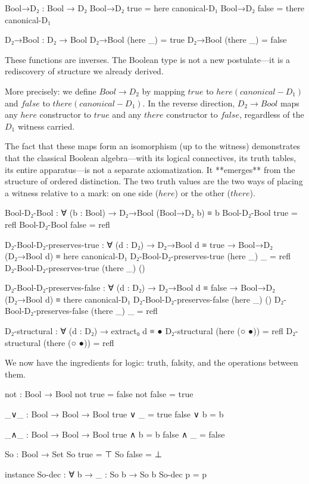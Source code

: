 \documentclass[11pt,a4paper]{book}
\def\texttt#1{#1}%
\def\text#1{#1}%
\begin{document}
\begin{code}
Bool→D₂ : Bool → D₂
Bool→D₂ true  = here canonical-D₁
Bool→D₂ false = there canonical-D₁

D₂→Bool : D₂ → Bool
D₂→Bool (here _)  = true
D₂→Bool (there _) = false
\end{code}

These functions are inverses. The Boolean type is not a new postulate---it 
is a rediscovery of structure we already derived.

More precisely: we define $\text{Bool} \to D_2$ by mapping $\texttt{true}$ to 
$\text{here}(\text{canonical-}D_1)$ and $\texttt{false}$ to $\text{there}(\text{canonical-}D_1)$. 
In the reverse direction, $D_2 \to \text{Bool}$ maps any $\text{here}$ constructor 
to $\texttt{true}$ and any $\text{there}$ constructor to $\texttt{false}$, regardless 
of the $D_1$ witness carried.

The fact that these maps form an isomorphism (up to the witness) demonstrates that 
the classical Boolean algebra—with its logical connectives, its truth tables, its 
entire apparatus—is not a separate axiomatization. It **emerges** from the structure 
of ordered distinction. The two truth values are the two ways of placing a witness 
relative to a mark: on one side ($\text{here}$) or the other ($\text{there}$).

\begin{code}
Bool-D₂-Bool : ∀ (b : Bool) → D₂→Bool (Bool→D₂ b) ≡ b
Bool-D₂-Bool true  = refl
Bool-D₂-Bool false = refl

D₂-Bool-D₂-preserves-true : ∀ (d : D₂) → D₂→Bool d ≡ true → 
  Bool→D₂ (D₂→Bool d) ≡ here canonical-D₁
D₂-Bool-D₂-preserves-true (here _) _ = refl
D₂-Bool-D₂-preserves-true (there _) ()

D₂-Bool-D₂-preserves-false : ∀ (d : D₂) → D₂→Bool d ≡ false → 
  Bool→D₂ (D₂→Bool d) ≡ there canonical-D₁
D₂-Bool-D₂-preserves-false (here _) ()
D₂-Bool-D₂-preserves-false (there _) _ = refl

D₂-structural : ∀ (d : D₂) → extract₀ d ≡ ●
D₂-structural (here (○ ●))  = refl
D₂-structural (there (○ ●)) = refl
\end{code}

We now have the ingredients for logic: truth, falsity, and the operations 
between them.

\begin{code}
not : Bool → Bool
not true = false
not false = true

_∨_ : Bool → Bool → Bool
true  ∨ _ = true
false ∨ b = b

_∧_ : Bool → Bool → Bool
true ∧ b = b
false ∧ _ = false

So : Bool → Set
So true  = ⊤
So false = ⊥

instance
  So-dec : ∀ {b} → {{_ : So b}} → So b
  So-dec {{p}} = p
\end{code}
\end{document}

